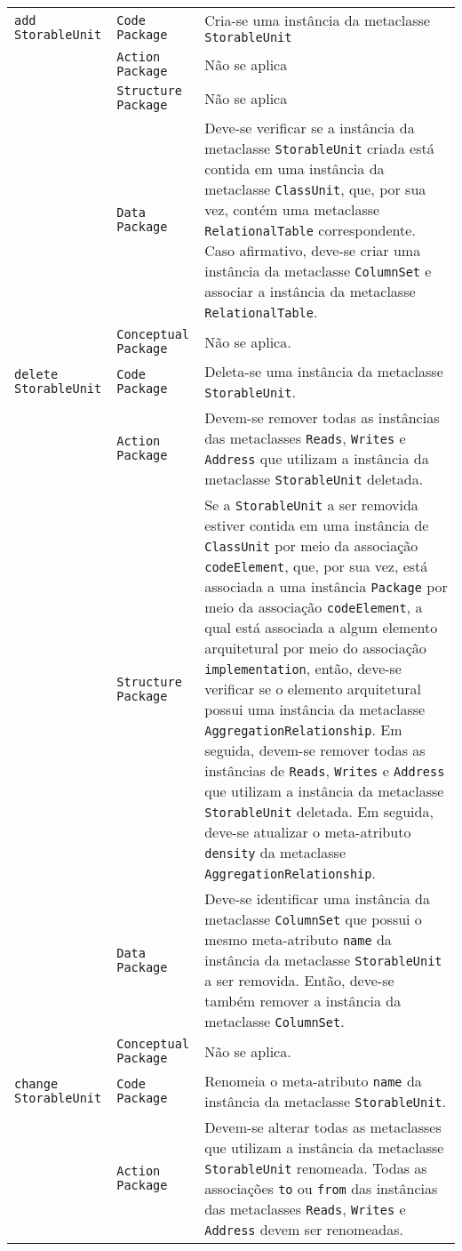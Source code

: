 \begin{longtable}{ | m{1.9cm} | m{3.57cm}| m{9.3cm} | }
 \texttt{add} \texttt{StorableUnit} & \texttt{Code Package} & Cria-se uma instância da metaclasse \texttt{StorableUnit}\tabularnewline
\cline{2-3} 
\cline{2-3} 
 & \texttt{Action Package} & Não se aplica \tabularnewline
 \cline{2-3} 
 & \texttt{Structure Package} & Não se aplica \tabularnewline
\cline{2-3} 
 & \texttt{Data Package} & Deve-se verificar se a instância da metaclasse \texttt{StorableUnit} criada está contida em uma instância da metaclasse \texttt{ClassUnit}, que, por sua vez, contém uma metaclasse \texttt{RelationalTable} correspondente. Caso afirmativo, deve-se criar uma instância da metaclasse \texttt{ColumnSet} e associar a instância da metaclasse \texttt{RelationalTable}. \tabularnewline
\cline{2-3} 
 & \texttt{Conceptual Package} & Não se aplica. \tabularnewline
\hline 
 \texttt{delete} \texttt{StorableUnit} & \texttt{Code Package} & Deleta-se uma instância da metaclasse \texttt{StorableUnit}.\tabularnewline
\cline{2-3} 
& \texttt{Action Package} & Devem-se remover todas as instâncias das metaclasses \texttt{Reads}, \texttt{Writes} e \texttt{Address} que utilizam a instância da metaclasse \texttt{StorableUnit} deletada. \tabularnewline
\cline{2-3}
& \texttt{Structure Package} & Se a \texttt{StorableUnit} a ser removida estiver contida em uma instância de \texttt{ClassUnit} por meio da associação \texttt{codeElement}, que, por sua vez, está associada a uma instância \texttt{Package} por meio da associação \texttt{codeElement}, a qual está associada a algum elemento arquitetural por meio do associação \texttt{implementation}, então, deve-se verificar se o elemento arquitetural possui uma instância da metaclasse \texttt{AggregationRelationship}. Em seguida, devem-se remover todas as instâncias de \texttt{Reads}, \texttt{Writes} e \texttt{Address} que utilizam a instância da metaclasse \texttt{StorableUnit} deletada. Em seguida, deve-se atualizar o meta-atributo \texttt{density} da metaclasse \texttt{AggregationRelationship}. \tabularnewline
\cline{2-3}
& \texttt{Data Package} & Deve-se identificar uma instância da metaclasse \texttt{ColumnSet} que possui o mesmo meta-atributo \texttt{name} da instância da metaclasse \texttt{StorableUnit} a ser removida. Então, deve-se também remover a instância da metaclasse \texttt{ColumnSet}. \tabularnewline
\cline{2-3}
& \texttt{Conceptual Package} & Não se aplica. \tabularnewline
\hline
\texttt{change} \texttt{StorableUnit} & \texttt{Code Package} & Renomeia o meta-atributo \texttt{name} da instância da metaclasse \texttt{StorableUnit}.\tabularnewline
\cline{2-3}
& \texttt{Action Package} & Devem-se alterar todas as metaclasses que utilizam a instância da metaclasse \texttt{StorableUnit} renomeada. Todas as associações \texttt{to} ou \texttt{from} das instâncias das metaclasses \texttt{Reads}, \texttt{Writes} e \texttt{Address} devem ser renomeadas. \tabularnewline

\end{longtable}
